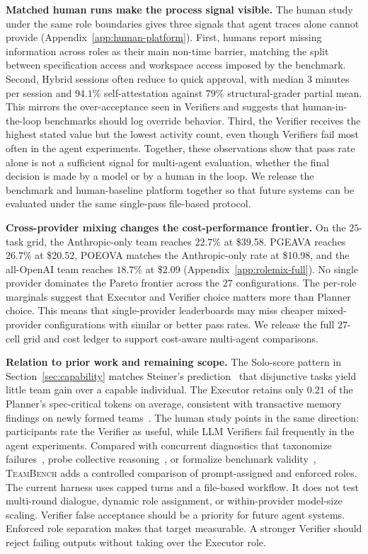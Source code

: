 \documentclass{article}
\begin{document}
\textbf{Matched human runs make the process signal visible.} The human study under the same role boundaries gives three signals that agent
traces alone cannot provide (Appendix~\ref{app:human-platform}).
First, humans report missing information across roles as their main non-time barrier, matching the split between specification access and workspace access imposed by the benchmark. Second, Hybrid sessions often reduce to quick approval, with
median $3$ minutes per session and $94.1\%$ self-attestation against $79\%$ structural-grader partial mean. This mirrors the over-acceptance seen in Verifiers and suggests that human-in-the-loop benchmarks should log override behavior.
Third, the Verifier receives the highest stated value but the lowest activity count, even though Verifiers fail most often in the agent experiments. Together, these observations show that pass rate alone is not a sufficient signal for
multi-agent evaluation, whether the final decision is made by a model or by a human in the loop. We release the benchmark and human-baseline platform together so that future systems can be evaluated under the same single-pass file-based protocol.

\textbf{Cross-provider mixing changes the cost-performance frontier.} On the $25$-task grid, the Anthropic-only team reaches $22.7\%$ at \$39.58.
PGEAVA reaches $26.7\%$ at \$20.52, POEOVA matches the Anthropic-only rate at \$10.98, and the all-OpenAI team reaches $18.7\%$ at \$2.09 (Appendix~\ref{app:rolemix-full}). No single provider dominates the Pareto frontier across the $27$ configurations. The per-role
marginals suggest that Executor and Verifier choice matters more than Planner choice. This means that single-provider leaderboards may miss cheaper mixed-provider configurations with similar or better pass rates. We release the full $27$-cell grid
and cost ledger to support cost-aware multi-agent comparisons.

\textbf{Relation to prior work and remaining scope.} The Solo-score pattern in Section~\ref{sec:capability} matches Steiner's
prediction~\citep{steiner1972group} that disjunctive tasks yield little team gain
over a capable individual. The Executor retains only $0.21$ of the Planner's spec-critical tokens on average, consistent with transactive memory findings on newly formed teams~\citep{wegner1987transactive,lewis2003measuring}. The human study points in the same direction: participants rate the Verifier as useful, while
LLM Verifiers fail frequently in the agent experiments. Compared with concurrent
diagnostics that taxonomize failures~\citep{cemri2025whyfail}, probe collective
reasoning~\citep{li2025hiddenbench}, or formalize benchmark validity~\citep{zhu2025abc},
\textsc{TeamBench} adds a controlled comparison of prompt-assigned and enforced roles. The current harness uses capped turns and a file-based workflow. It does not test multi-round dialogue, dynamic role assignment, or within-provider model-size scaling. Verifier false acceptance should be a priority for future agent systems. Enforced role separation makes that target measurable. A stronger Verifier should reject failing outputs without taking over the Executor role.
\end{document}
